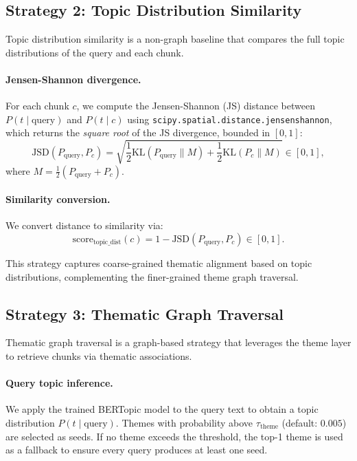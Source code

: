 \documentclass[10pt]{article}
\begin{document}
\subsection{Strategy 2: Topic Distribution Similarity}

Topic distribution similarity is a non-graph baseline that compares the full
topic distributions of the query and each chunk.

\paragraph{Jensen-Shannon divergence.} For each chunk $c$, we compute the
Jensen-Shannon (JS) distance between $P(t \mid \text{query})$ and $P(t \mid c)$
using \texttt{scipy.spatial.distance.jensenshannon}, which returns the
\emph{square root} of the JS divergence, bounded in $[0, 1]$:
\[
\text{JSD}(P_{\text{query}}, P_c) = \sqrt{\frac{1}{2} \text{KL}(P_{\text{query}}
\| M) + \frac{1}{2} \text{KL}(P_c \| M)} \in [0, 1],
\]
where $M = \frac{1}{2}(P_{\text{query}} + P_c)$.

\paragraph{Similarity conversion.} We convert distance to similarity via:
\[
\text{score}_{\text{topic\_dist}}(c) = 1 - \text{JSD}(P_{\text{query}}, P_c)
\in [0, 1].
\]

This strategy captures coarse-grained thematic alignment based on topic
distributions, complementing the finer-grained theme graph traversal.


\subsection{Strategy 3: Thematic Graph Traversal}

Thematic graph traversal is a graph-based strategy that leverages the theme layer
to retrieve chunks via thematic associations.

\paragraph{Query topic inference.} We apply the trained BERTopic model to the
query text to obtain a topic distribution $P(t \mid \text{query})$. Themes with
probability above $\tau_{\text{theme}}$ (default: $0.005$) are selected as seeds.
If no theme exceeds the threshold, the top-1 theme is used as a fallback to
ensure every query produces at least one seed.
\end{document}
